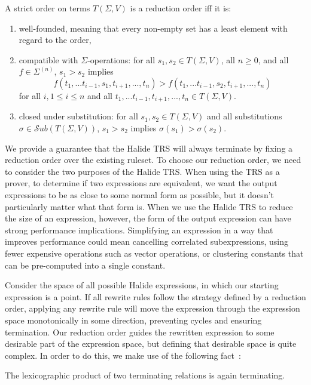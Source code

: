 \documentclass[sigplan,10pt,review,anonymous]{acmart}\settopmatter{printfolios=true,printccs=false,printacmref=false}
\begin{document}
\begin{definition}
A strict order on terms $T(\Sigma, V)$ is a reduction order iff it is: 
\begin{enumerate}
    \item well-founded, meaning that every non-empty set has a least element with regard to the order,
    \item compatible with $\Sigma$-operations: for all $s_1, s_2 \in T(\Sigma,V)$, all $n \geq 0$, and all $f \in \Sigma^{(n)}$, $s_1 > s_2$ implies
    \[ f(t_1,...t_{i-1},s_1,t_{i+1},...,t_n) > f(t_1,...t_{i-1},s_2,t_{i+1},...,t_n)
    \]
    for all $i, 1 \leq i \leq n$ and all $t_1,...t_{i-1},t_{i+1},...,t_n \in T(\Sigma,V)$.
    \item closed under substitution: for all $s_1, s_2 \in T(\Sigma,V)$ and all substitutions $\sigma \in \mathcal{S}ub(T(\Sigma,V))$, $s_1 > s_2$ implies $\sigma(s_1) > \sigma(s_2)$.
\end{enumerate}
\end{definition}

We provide a guarantee that the Halide TRS will always terminate by fixing a
reduction order over the existing ruleset. To choose our reduction order, we
need to consider the two purposes of the Halide TRS. When using the TRS
as a prover, to determine if two expressions are equivalent, we want
the output expressions to be as close to some normal form as possible, but it
doesn't particularly matter what that form is. When we use the Halide TRS
to reduce the size of an expression, however, the form of the output expression
can have strong performance implications.
Simplifying an expression in a way that
improves performance could mean cancelling correlated subexpressions, using
fewer expensive operations such as vector operations, or clustering constants
that can be pre-computed into a single constant.

Consider the space of all possible Halide expressions, in which our starting
expression is a point. If all rewrite rules follow the strategy defined by a reduction order, applying any
rewrite rule will move the expression through the expression space monotonically
in some direction, preventing cycles and ensuring termination. Our reduction
order guides the rewritten expression to some desirable part of the
expression space, but defining that desirable space is quite complex. In order
to do this, we make use of the following fact~\cite{baader1999term}:

\begin{theorem}
The lexicographic product of two terminating relations is again terminating.
\end{theorem}
\end{document}
